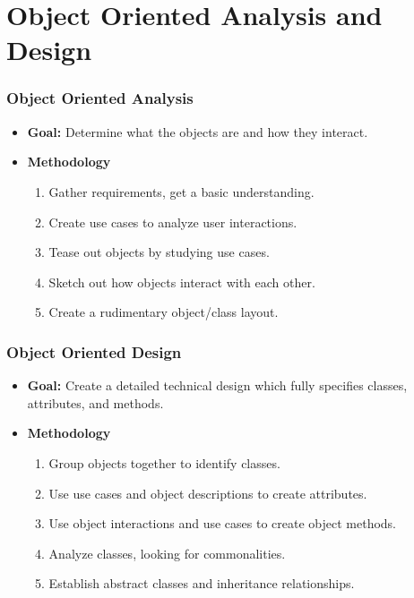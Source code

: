 \documentclass{beamer}
\begin{document}
\section{Object Oriented Analysis and Design}
\begin{frame}
    \frametitle{Object Oriented Analysis}
    \begin{itemize}[<+->]
        \item {\bf Goal: } Determine what the objects are and how they interact.
        \item {\bf Methodology}
        \begin{enumerate}[<+->]
            \item Gather requirements, get a basic understanding.
            \item Create use cases to analyze user interactions.
            \item Tease out objects by studying use cases.
            \item Sketch out how objects interact with each other.
            \item Create a rudimentary object/class layout.
        \end{enumerate}
    \end{itemize}
\end{frame}

\begin{frame}
    \frametitle{Object Oriented Design}
    \begin{itemize}[<+->]
        \item {\bf Goal:} Create a detailed technical design which fully 
            specifies classes, attributes, and methods.
        \item {\bf Methodology}
        \begin{enumerate}[<+->]
            \item Group objects together to identify classes.
            \item Use use cases and object descriptions to create attributes.
            \item Use object interactions and use cases to create object methods.
            \item Analyze classes, looking for commonalities.
            \item Establish abstract classes and inheritance relationships.
        \end{enumerate}
    \end{itemize}
\end{frame}
\end{document}
